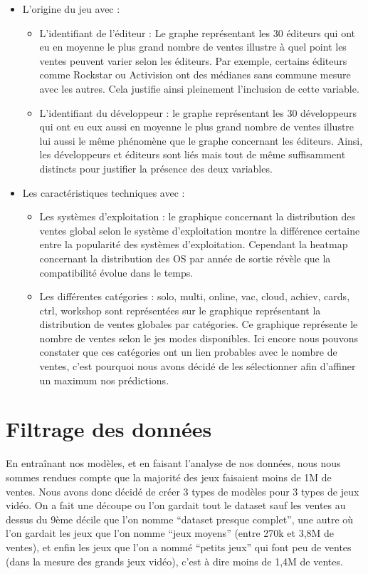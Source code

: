 \documentclass[mstat,12pt]{unswthesis}
\begin{document}
\begin{itemize}
\item L’origine du jeu avec : 
\begin{itemize}
\item L’identifiant de l’éditeur : Le graphe représentant les 30 éditeurs qui ont eu en moyenne le plus grand nombre de ventes illustre à quel point les ventes peuvent varier selon les éditeurs. Par exemple, certains éditeurs comme Rockstar ou Activision ont des médianes sans commune mesure avec les autres. Cela justifie ainsi pleinement l’inclusion de cette variable.
\item L’identifiant du développeur :   le graphe représentant les 30 développeurs qui ont eu eux aussi en moyenne le plus grand nombre de ventes illustre lui aussi le même phénomène que le graphe concernant les éditeurs. Ainsi, les développeurs et éditeurs sont liés mais tout de même suffisamment distincts pour justifier la présence des deux variables.
\end{itemize}

\item Les caractéristiques techniques avec : 
\begin{itemize}
\item Les systèmes d’exploitation :  le graphique concernant la distribution des ventes global selon le système d’exploitation montre la différence certaine entre la popularité des systèmes d’exploitation. Cependant la heatmap concernant la distribution des OS par année de sortie révèle que la compatibilité évolue dans le temps. 
\item Les différentes catégories : solo, multi, online, vac, cloud, achiev, cards, ctrl, workshop sont représentées sur le graphique représentant la distribution de ventes globales par catégories. Ce graphique représente le nombre de ventes selon le jes modes disponibles. Ici encore nous pouvons constater que ces catégories ont un lien probables avec le nombre de ventes, c’est pourquoi nous avons décidé de les sélectionner afin d’affiner un maximum nos prédictions. 
\end{itemize}

\end{itemize}


\hypertarget{FiltrageDesDonnées}{%
\section{\textbf{Filtrage des données}}\label{FiltrageDesDonnées}}

En entraînant nos modèles, et en faisant l’analyse de nos données, nous nous sommes rendues compte que la majorité des jeux faisaient moins de 1M de ventes. Nous avons donc décidé de créer 3 types de modèles pour 3 types de jeux vidéo. On a fait une découpe ou l’on gardait tout le dataset sauf les ventes au dessus du 9ème décile que l’on nomme “dataset presque complet”, une autre où l’on gardait les jeux que l’on nomme “jeux moyens” (entre 270k et 3,8M de ventes), et enfin les jeux que l’on a nommé “petits jeux” qui font peu de ventes (dans la mesure des grands jeux vidéo), c’est à dire moins de 1,4M de ventes.
\end{document}
